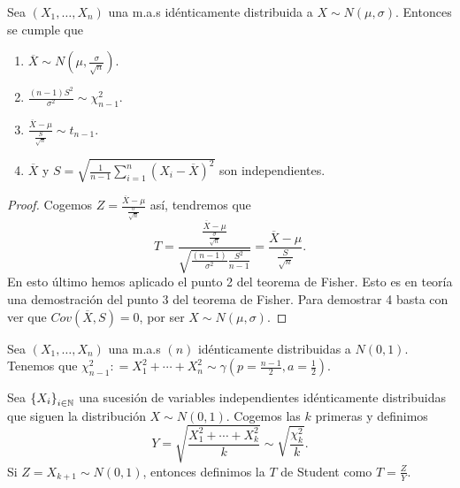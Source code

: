 \begin{theorem}
Sea $\displaystyle \left(X_{1}, \ldots, X_{n}\right) $ una m.a.s idénticamente distribuida a $\displaystyle X \sim N\left(\mu, \sigma \right) $. Entonces se cumple que 
\begin{enumerate}
\item $\displaystyle \overline{X} \sim N\left(\mu, \frac{\sigma }{\sqrt{n}}\right) $. 
\item $\displaystyle \frac{\left(n-1\right)S^{2}}{\sigma^{2}} \sim \chi^{2}_{n-1} $. 
\item $\displaystyle \frac{\overline{X}-\mu}{\frac{S}{\sqrt{n}}} \sim t_{n-1}$. 
\item $\displaystyle \overline{X} $ y $\displaystyle S = \sqrt{\frac{1}{n-1}\sum^{n}_{i = 1}\left(X_{i}-\overline{X}\right)^{2}} $ son independientes.
\end{enumerate}
\end{theorem}
\begin{proof}
Cogemos $\displaystyle Z = \frac{\overline{X}-\mu}{\frac{\sigma  }{\sqrt{n}}} $ así, tendremos que
\[T = \frac{\frac{\overline{X}-\mu}{\frac{\sigma }{\sqrt{n}}}}{\sqrt{\frac{\left(n-1\right)}{\sigma^{2}}\frac{S^{2}}{n-1}}} = \frac{\overline{X}-\mu}{\frac{S}{\sqrt{n}}} .\]
En esto último hemos aplicado el punto 2 del teorema de Fisher. Esto es en teoría una demostración del punto 3 del teorema de Fisher. Para demostrar 4 basta con ver que $\displaystyle Cov\left(\overline{X}, S\right)= 0 $, por ser $\displaystyle X \sim N\left(\mu, \sigma \right) $. 
\end{proof}

\begin{definition}
	Sea $\displaystyle \left(X_{1}, \ldots, X_{n}\right) $ una m.a.s $\displaystyle \left(n\right) $ idénticamente distribuidas a $\displaystyle N\left(0,1\right) $. Tenemos que $\displaystyle \chi^{2}_{n-1} : = X_{1}^{2} + \cdots + X_{n}^{2} \sim \gamma\left(p = \frac{n-1}{2}, a = \frac{1}{2}\right) $. 
\end{definition}
\begin{definition}
	Sea $\displaystyle \left\{ X_{i}\right\} _{i \in \mathbb{N}} $ una sucesión de variables independientes idénticamente distribuidas que siguen la distribución $\displaystyle X \sim N\left(0,1\right) $. Cogemos las $\displaystyle k $ primeras y definimos
	\[ Y = \sqrt{\frac{X_{1}^{2} + \cdots + X_{k}^{2}}{k}} \sim \sqrt{\frac{\chi_{k}^{2}}{k}} .\]
Si $\displaystyle Z = X_{k + 1} \sim N\left(0,1\right) $, entonces definimos la $\displaystyle T $ de Student como $\displaystyle T = \frac{Z}{Y} $. 	
\end{definition}
